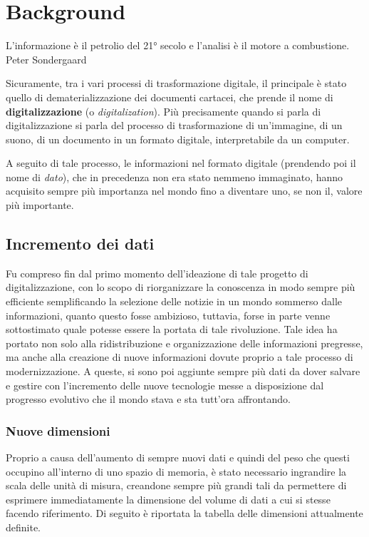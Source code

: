 \chapter{Background}
\label{ch:Background}

\begin{citazione}
 L'informazione è il petrolio del 21° secolo e l'analisi è il motore a combustione. Peter Sondergaard~\cite{peter_sondergaard_cyte}
\end{citazione}

Sicuramente, tra i vari processi di trasformazione digitale, il principale è stato quello di dematerializzazione dei documenti cartacei, che prende il nome di \textbf{digitalizzazione} (o \textit{digitalization}). Più precisamente quando si parla di digitalizzazione si parla del processo di trasformazione di un'immagine, di un suono, di un documento in un formato digitale, interpretabile da un computer.~\cite{wikipedia_digitalization_definition}

A seguito di tale processo, le informazioni nel formato digitale (prendendo poi il nome di \textit{dato}), che in precedenza non era stato nemmeno immaginato, hanno acquisito sempre più importanza nel mondo fino a diventare uno, se non il, valore più importante.

\section{Incremento dei dati}
Fu compreso fin dal primo momento dell'ideazione di tale progetto di digitalizzazione, con lo scopo di riorganizzare la conoscenza in modo sempre più efficiente semplificando la selezione delle notizie in un mondo sommerso dalle informazioni, quanto questo fosse ambizioso, tuttavia, forse in parte venne sottostimato quale potesse essere la portata di tale rivoluzione. Tale idea ha portato non solo alla ridistribuzione e organizzazione delle informazioni pregresse, ma anche alla creazione di nuove informazioni dovute proprio a tale processo di modernizzazione. A queste, si sono poi aggiunte sempre più dati da dover salvare e gestire con l'incremento delle nuove tecnologie messe a disposizione dal progresso evolutivo che il mondo stava e sta tutt'ora affrontando. 

\subsection{Nuove dimensioni}

Proprio a causa dell'aumento di sempre nuovi dati e quindi del peso che questi occupino all'interno di uno spazio di memoria, è stato necessario ingrandire la scala delle unità di misura, creandone sempre più grandi tali da permettere di esprimere immediatamente la dimensione del volume di dati a cui si stesse facendo riferimento. Di seguito è riportata la tabella delle dimensioni attualmente definite.~\cite{datadrivendaily_dimension_table}

